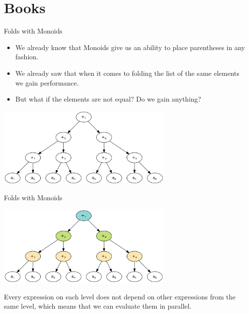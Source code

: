 \documentclass[presentation,aspectratio=169,smaller]{beamer}
\begin{document}
\section*{Books}
\label{sec:org6a07640}

\begin{frame}[label={sec:org3b983fb}]{Folds with Monoids}
\begin{itemize}
\item We already know that Monoids give us an ability to place parentheses in any
fashion.
\item We already saw that when it comes to folding the list of the same elements we
gain performance.
\item But what if the elements are not equal? Do we gain anything?
\end{itemize}

\pause
\begin{center}
\includegraphics[height=4cm]{.dot/fold-parallel-1.png}
\end{center}
\end{frame}

\begin{frame}[label={sec:orga877565}]{Folds with Monoids}
\begin{center}
\includegraphics[height=4cm]{.dot/fold-parallel-2.png}
\end{center}

Every expression on each level does not depend on other expressions from the
same level, which means that we can evaluate them in parallel.
\end{frame}
\end{document}
